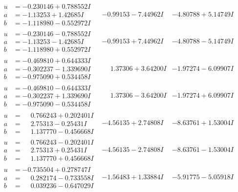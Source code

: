\documentclass[1p]{elsarticle_modified}
\theoremstyle{definition}
\begin{document}
$$\begin{array}{c|c|c}
\begin{aligned}
u &= -0.230146 + 0.788552 I \\
a &= -1.13253 + 1.42685 I \\
b &= -1.118980 - 0.552972 I\end{aligned}
 & -0.99153 - 7.44962 I & -4.80788 + 5.14749 I \\ \hline\begin{aligned}
u &= -0.230146 - 0.788552 I \\
a &= -1.13253 - 1.42685 I \\
b &= -1.118980 + 0.552972 I\end{aligned}
 & -0.99153 + 7.44962 I & -4.80788 - 5.14749 I \\ \hline\begin{aligned}
u &= -0.469810 + 0.644333 I \\
a &= -0.302237 - 1.339690 I \\
b &= -0.975090 + 0.534458 I\end{aligned}
 & \phantom{-}1.37306 + 3.64200 I & -1.97274 - 6.09907 I \\ \hline\begin{aligned}
u &= -0.469810 - 0.644333 I \\
a &= -0.302237 + 1.339690 I \\
b &= -0.975090 - 0.534458 I\end{aligned}
 & \phantom{-}1.37306 - 3.64200 I & -1.97274 + 6.09907 I \\ \hline\begin{aligned}
u &= \phantom{-}0.766243 + 0.202401 I \\
a &= \phantom{-}2.75313 - 0.25431 I \\
b &= \phantom{-}1.137770 - 0.456668 I\end{aligned}
 & -4.56135 + 2.74808 I & -8.63761 + 1.53004 I \\ \hline\begin{aligned}
u &= \phantom{-}0.766243 - 0.202401 I \\
a &= \phantom{-}2.75313 + 0.25431 I \\
b &= \phantom{-}1.137770 + 0.456668 I\end{aligned}
 & -4.56135 - 2.74808 I & -8.63761 - 1.53004 I \\ \hline\begin{aligned}
u &= -0.735504 + 0.278747 I \\
a &= \phantom{-}0.282174 - 0.733558 I \\
b &= \phantom{-}0.039236 - 0.647029 I\end{aligned}
 & -1.56483 + 1.33884 I & -5.91775 - 5.05918 I \\ \hline\begin{aligned}

\end{aligned}
\end{array}$$
\end{document}
